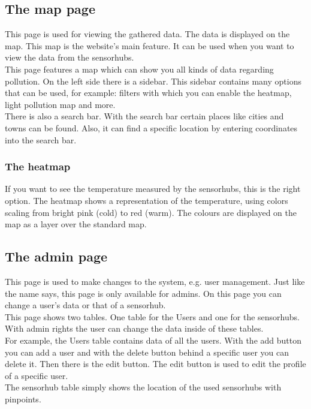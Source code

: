 \documentclass[a4paper]{article}
\begin{document}
\pagebreak

\subsection{The map page}
This page is used for viewing the gathered data. The data is displayed on the map. This map is the website's main feature. It can be used when you want to view the data from the sensorhubs.
\\
This page features a map which can show you all kinds of data regarding pollution. On the left side there is a sidebar. This sidebar contains many options that can be used, for example: filters with which you can enable the heatmap, light pollution map and more.
\\
There is also a search bar. With the search bar certain places like cities and towns can be found. Also, it can find a specific location by entering coordinates into the search bar.
~\\

\subsubsection{The heatmap}
If you want to see the temperature measured by the sensorhubs, this is the right option.
The heatmap shows a representation of the temperature, using colors scaling from bright pink (cold) to red (warm). The colours are displayed on the map as a layer over the standard map.
% 
% 

\pagebreak

\subsection{The admin page}
This page is used to make changes to the system, e.g. user management. Just like the name says, this page is only available for admins. On this page you can change a user's data or that of a sensorhub.
\\
This page shows two tables. One table for the Users and one for the sensorhubs. With admin rights the user can change the data inside of these tables.
\\
For example, the Users table contains data of all the users. With the add button you can add a user and with the delete button behind a specific user you can delete it. Then there is the edit button. The edit button is used to edit the profile of a specific user.
\\
The sensorhub table simply shows the location of the used sensorhubs with pinpoints.

% 
%
%
% 
\end{document}

